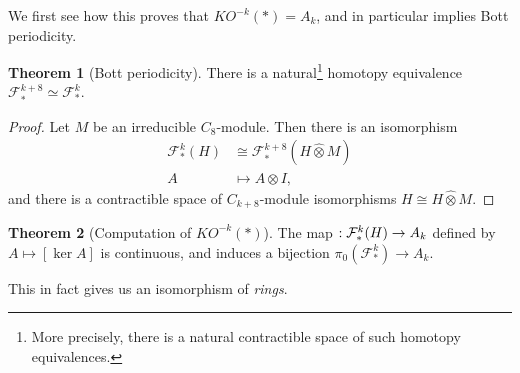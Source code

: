 \documentclass{shortart}
\theoremstyle{definition}
\newtheorem*{thm}{Theorem}
\let\index\relax
\DeclareMathOperator{\index}{idx}
\newcommand\gotimes{\mathbin{\hat\otimes}}
\begin{document}
We first see how this proves that $KO^{-k}(*) = A_k$, and in particular implies Bott periodicity.
\begin{thm}[Bott periodicity]
  There is a natural\footnote{More precisely, there is a natural contractible space of such homotopy equivalences.} homotopy equivalence $\mathcal{F}_*^{k + 8} \simeq \mathcal{F}_*^k$.
\end{thm}
\begin{proof}
  Let $M$ be an irreducible $C_8$-module. Then there is an isomorphism
  \begin{align*}
    \mathcal{F}_*^k(H) &\cong \mathcal{F}_*^{k + 8}(H \gotimes M)\\
    A &\mapsto A \otimes I,
  \end{align*}
  and there is a contractible space of $C_{k + 8}$-module isomorphisms $H \cong H\gotimes M$.
\end{proof}
\begin{thm}[Computation of $KO^{-k}(*)$]
  The map $\index: \mathcal{F}_*^k(H) \to A_k$ defined by $A \mapsto [\ker A]$ is continuous, and induces a bijection $\pi_0(\mathcal{F}^k_*) \to A_k$.
\end{thm}
This in fact gives us an isomorphism of \emph{rings}.
\end{document}
